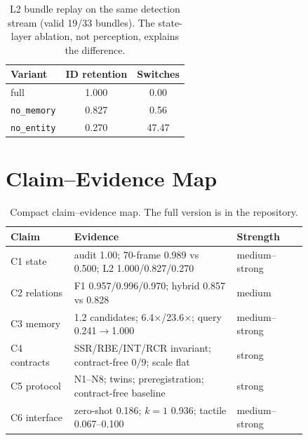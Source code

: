 \documentclass[10pt]{article}
\begin{document}
\begin{table}[ht]
\centering
\small
\begin{tabular}{@{}lcc@{}}
\toprule
Variant & ID retention & Switches \\
\midrule
full & 1.000 & 0.00 \\
\texttt{no\_memory} & 0.827 & 0.56 \\
\texttt{no\_entity} & 0.270 & 47.47 \\
\bottomrule
\end{tabular}
\caption{L2 bundle replay on the same detection stream (valid 19/33 bundles).
The state-layer ablation, not perception, explains the difference.}
\label{tab:l2-bundles}
\end{table}

\section{Claim--Evidence Map}

\begin{table}[ht]
\centering
\small
\begin{tabular}{@{}p{0.18\linewidth}p{0.46\linewidth}p{0.20\linewidth}@{}}
\toprule
Claim & Evidence & Strength \\
\midrule
C1 state & audit 1.00; 70-frame 0.989 vs 0.500; L2 1.000/0.827/0.270 & medium--strong \\
C2 relations & F1 0.957/0.996/0.970; hybrid 0.857 vs 0.828 & medium \\
C3 memory & 1.2 candidates; 6.4$\times$/23.6$\times$; query 0.241$\rightarrow$1.000 & medium--strong \\
C4 contracts & SSR/RBE/INT/RCR invariant; contract-free 0/9; scale flat & strong \\
C5 protocol & N1--N8; twins; preregistration; contract-free baseline & strong \\
C6 interface & zero-shot 0.186; $k=1$ 0.936; tactile 0.067--0.100 & medium--strong \\
\bottomrule
\end{tabular}
\caption{Compact claim--evidence map. The full version is in the repository.}
\end{table}
\end{document}
